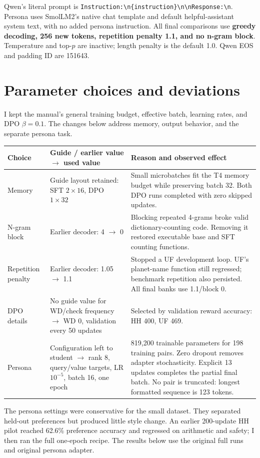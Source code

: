 \documentclass[11pt,a4paper]{article}
\begin{document}
Qwen's literal prompt is \texttt{Instruction:\textbackslash n\{instruction\}\textbackslash n\textbackslash nResponse:\textbackslash n}. Persona uses SmolLM2's native chat template and default helpful-assistant system text, with no added persona instruction. All final comparisons use \textbf{greedy decoding, 256 new tokens, repetition penalty 1.1, and no n-gram block}. Temperature and top-$p$ are inactive; length penalty is the default 1.0. Qwen EOS and padding ID are 151643.

\section{Parameter choices and deviations}
I kept the manual's general training budget, effective batch, learning rates, and DPO $\beta=0.1$. The changes below address memory, output behavior, and the separate persona task.
\begin{table}[H]
\centering\small
\begin{tabularx}{\linewidth}{@{}p{.18\linewidth}p{.24\linewidth}Y@{}}\toprule
Choice & Guide / earlier value $\rightarrow$ used value & Reason and observed effect\\\midrule
Memory & Guide layout retained: SFT $2\times16$, DPO $1\times32$ & Small microbatches fit the T4 memory budget while preserving batch 32. Both DPO runs completed with zero skipped updates.\\
N-gram block & Earlier decoder: 4 $\rightarrow$ 0 & Blocking repeated 4-grams broke valid dictionary-counting code. Removing it restored executable base and SFT counting functions.\\
Repetition penalty & Earlier decoder: 1.05 $\rightarrow$ 1.1 & Stopped a UF development loop. UF's planet-name function still regressed; benchmark repetition also persisted. All final banks use 1.1/block 0.\\
DPO details & No guide value for WD/check frequency $\rightarrow$ WD 0, validation every 50 updates & Selected by validation reward accuracy: HH 400, UF 469.\\
Persona & Configuration left to student $\rightarrow$ rank 8, query/value targets, LR $10^{-5}$, batch 16, one epoch & 819,200 trainable parameters for 198 training pairs. Zero dropout removes adapter stochasticity. Explicit 13 updates completes the partial final batch. No pair is truncated: longest formatted sequence is 123 tokens.\\\bottomrule
\end{tabularx}
\end{table}
The persona settings were conservative for the small dataset. They separated held-out preferences but produced little style change. An earlier 200-update HH pilot reached 62.6\% preference accuracy and regressed on arithmetic and safety; I then ran the full one-epoch recipe. The results below use the original full runs and original persona adapter.
\end{document}

